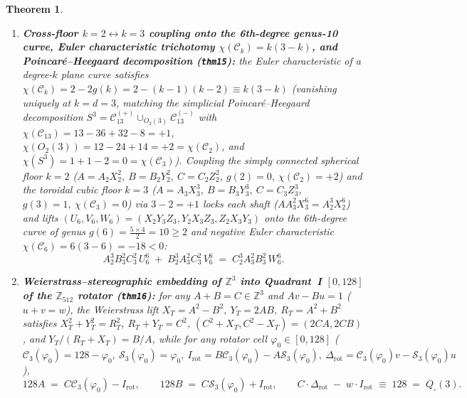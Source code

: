 \documentclass[11pt,a4paper]{article}
\theoremstyle{plain}
\newtheorem{theorem}{Theorem}[section]
\theoremstyle{definition}
\begin{document}
\begin{theorem}
\begin{enumerate}[label=\textbf{(\roman*)},leftmargin=*]
\item \textbf{Cross-floor $k=2 \leftrightarrow k=3$ coupling onto the 6th-degree genus-10 curve, Euler characteristic trichotomy $\chi(\mathcal{C}_k) = k(3-k)$, and Poincaré--Heegaard decomposition (\texttt{thm15}):}
  the Euler characteristic of a degree-$k$ plane curve satisfies $\chi(\mathcal{C}_k) = 2 - 2g(k) = 2 - (k-1)(k-2) \equiv k(3-k)$ (vanishing uniquely at $k = d = 3$, matching the simplicial Poincaré--Heegaard decomposition $S^3 = \mathcal{C}_{13}^{(+)}\cup_{O_2(3)}\mathcal{C}_{13}^{(-)}$ with $\chi(\mathcal{C}_{13}) = 13-36+32-8 = +1$, $\chi(O_2(3)) = 12-24+14 = +2 = \chi(\mathcal{C}_2)$, and $\chi(S^3) = 1+1-2 = 0 = \chi(\mathcal{C}_3)$). Coupling the simply connected spherical floor $k=2$ ($A = A_2 X_2^2,\ B = B_2 Y_2^2,\ C = C_2 Z_2^2$, $g(2)=0,\ \chi(\mathcal{C}_2)=+2$) and the toroidal cubic floor $k=3$ ($A = A_3 X_3^3,\ B = B_3 Y_3^3,\ C = C_3 Z_3^3$, $g(3)=1,\ \chi(\mathcal{C}_3)=0$) via $3-2=+1$ locks each shaft ($A A_3^2 X_3^6 = A_2^3 X_2^6$) and lifts $(U_6,V_6,W_6) = (X_2 Y_3 Z_3, Y_2 X_3 Z_3, Z_2 X_3 Y_3)$ onto the 6th-degree curve of genus $g(6) = \frac{5\times 4}{2} = 10 \ge 2$ and negative Euler characteristic $\chi(\mathcal{C}_6) = 6(3-6) = -18 < 0$:
  \begin{equation}
    \label{eq:genus-10-curve}
    A_2^3 B_3^2 C_3^2\,U_6^6 \;+\; B_2^3 A_3^2 C_3^2\,V_6^6 \;=\; C_2^3 A_3^2 B_3^2\,W_6^6.
  \end{equation}
\item \textbf{Weierstrass--stereographic embedding of $\mathbb{Z}^3$ into Quadrant~I $[0,128]$ of the $\mathbb{Z}_{512}$ rotator (\texttt{thm16}):}
  for any $A+B=C\in\mathbb{Z}^3$ and $A v - B u = 1$ ($u+v=w$), the Weierstrass lift $X_T = A^2-B^2,\ Y_T = 2AB,\ R_T = A^2+B^2$ satisfies $X_T^2+Y_T^2=R_T^2$, $R_T+Y_T=C^2$, $(C^2+X_T,C^2-X_T)=(2CA,2CB)$, and $Y_T/(R_T+X_T) = B/A$, while for any rotator cell $\varphi_0\in[0,128]$ ($\mathcal{C}_3(\varphi_0)=128-\varphi_0,\ \mathcal{S}_3(\varphi_0)=\varphi_0,\ I_{\mathrm{rot}} = B\mathcal{C}_3(\varphi_0)-A\mathcal{S}_3(\varphi_0),\ \Delta_{\mathrm{rot}} = \mathcal{C}_3(\varphi_0)v-\mathcal{S}_3(\varphi_0)u$),
  \begin{equation}
    \label{eq:quarter-ring-invariant}
    128 A \;=\; C\mathcal{C}_3(\varphi_0) - I_{\mathrm{rot}},\qquad
    128 B \;=\; C\mathcal{S}_3(\varphi_0) + I_{\mathrm{rot}},\qquad
    C\cdot\Delta_{\mathrm{rot}} \;-\; w\cdot I_{\mathrm{rot}} \;\equiv\; 128 \;=\; Q_\square(3).
  \end{equation}
\end{enumerate}
\end{theorem}
\end{document}
